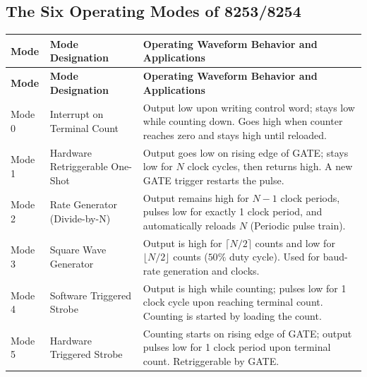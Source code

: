 \documentclass[12pt,a4paper]{article}
\begin{document}
\subsection{The Six Operating Modes of 8253/8254}
\par\vspace{6pt}\noindent
\begingroup
\setlength{\extrarowheight}{2.5pt}
\begingroup
\setlength{\LTleft}{0pt}
\setlength{\LTright}{0pt}
\begin{longtable}{|B{1.8cm}|B{3.2cm}|>{\small\raggedright\arraybackslash}m{\dimexpr(\linewidth-1.8cm-3.2cm-6\arrayrulewidth)/1\relax}|}
\hline
\textbf{Mode} & \textbf{Mode Designation} & \textbf{Operating Waveform Behavior and Applications} \\ \hline
\endfirsthead
\hline
\textbf{Mode} & \textbf{Mode Designation} & \textbf{Operating Waveform Behavior and Applications} \\ \hline
\endhead
Mode 0 & Interrupt on Terminal Count & Output low upon writing control word; stays low while counting down. Goes high when counter reaches zero and stays high until reloaded. \\ \hline
Mode 1 & Hardware Retriggerable One-Shot & Output goes low on rising edge of GATE; stays low for $N$ clock cycles, then returns high. A new GATE trigger restarts the pulse. \\ \hline
Mode 2 & Rate Generator (Divide-by-N) & Output remains high for $N-1$ clock periods, pulses low for exactly 1 clock period, and automatically reloads $N$ (Periodic pulse train). \\ \hline
Mode 3 & Square Wave Generator & Output is high for $\lceil N/2 \rceil$ counts and low for $\lfloor N/2 \rfloor$ counts ($50\%$ duty cycle). Used for baud-rate generation and clocks. \\ \hline
Mode 4 & Software Triggered Strobe & Output is high while counting; pulses low for 1 clock cycle upon reaching terminal count. Counting is started by loading the count. \\ \hline
Mode 5 & Hardware Triggered Strobe & Counting starts on rising edge of GATE; output pulses low for 1 clock period upon terminal count. Retriggerable by GATE. \\ \hline
\end{longtable}
\endgroup\par
\endgroup
\end{document}
